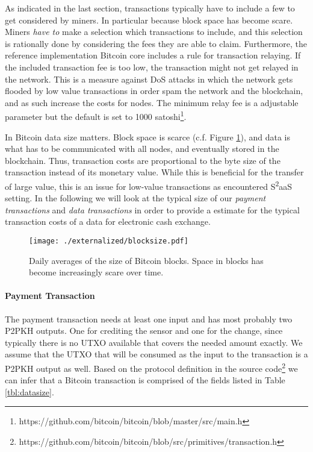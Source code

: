 As indicated in the last section, transactions typically have to include a few to get considered by miners. In particular because block space has become scare. Miners \emph{have to} make a selection which transactions to include, and this selection is rationally done by considering the fees they are able to claim. Furthermore, the reference implementation Bitcoin core includes a rule for transaction relaying. If the included transaction fee is too low, the transaction might not get relayed in the network. This is a measure against \ac{DoS} attacks in which the network gets flooded by low value transactions in order spam the network and the blockchain, and as such increase the costs for nodes.
The minimum relay fee is a adjustable parameter but the default is set to 1000 satoshi\footnote{https://github.com/bitcoin/bitcoin/blob/master/src/main.h}.

In Bitcoin data size matters. Block space is scarce (c.f. Figure \ref{fig:blocksize_btc}), and data is what has to be communicated with all nodes, and eventually stored in the blockchain. Thus, transaction costs are proportional to the byte size of the transaction instead of its monetary value. While this is beneficial for the transfer of large value, this is an issue for low-value transactions as encountered S\textsuperscript{2}aaS setting. In the following we will look at the typical size of our \emph{payment transactions} and \emph{data transactions} in order to provide a estimate for the typical transaction costs of a data for electronic cash exchange.

\begin{figure}
  \centering
    \centering\texttt{[image: ./externalized/blocksize.pdf]}
    \caption{Daily averages of the size of Bitcoin blocks. Space in blocks has become increasingly scare over time.}
    \label{fig:blocksize_btc}
\end{figure}

\paragraph{Payment Transaction}
The payment transaction needs at least one input and has most probably two \ac{P2PKH} outputs. One for crediting the sensor and one for the change, since typically there is no \ac{UTXO} available that covers the needed amount exactly.
We assume that the \ac{UTXO} that will be consumed as the input to the transaction is a \ac{P2PKH} output as well.
Based on the protocol definition in the source code\footnote{https://github.com/bitcoin/bitcoin/blob/src/primitives/transaction.h} we can infer that a Bitcoin transaction is comprised of the fields listed in Table \ref{tbl:datasize}.

